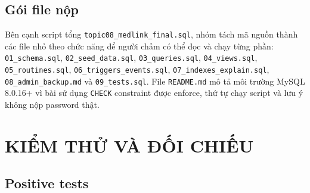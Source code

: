 \documentclass[12pt, a4paper, oneside, openany]{report}
\newcommand{\dbid}[1]{{\normalfont\ttfamily\footnotesize\nolinkurl{#1}}}
\begin{document}
\section{Gói file nộp}

Bên cạnh script tổng \dbid{topic08_medlink_final.sql}, nhóm tách mã nguồn thành các file nhỏ theo chức năng để người chấm có thể đọc và chạy từng phần: \dbid{01_schema.sql}, \dbid{02_seed_data.sql}, \dbid{03_queries.sql}, \dbid{04_views.sql}, \dbid{05_routines.sql}, \dbid{06_triggers_events.sql}, \dbid{07_indexes_explain.sql}, \dbid{08_admin_backup.md} và \dbid{09_tests.sql}. File \dbid{README.md} mô tả môi trường MySQL 8.0.16+ vì bài sử dụng \texttt{CHECK} constraint được enforce, thứ tự chạy script và lưu ý không nộp password thật.

\normalfont\normalsize\selectfont

\chapter{KIỂM THỬ VÀ ĐỐI CHIẾU}

\normalfont\normalsize\selectfont

\section{Positive tests}

\normalfont\normalsize\selectfont
\end{document}
